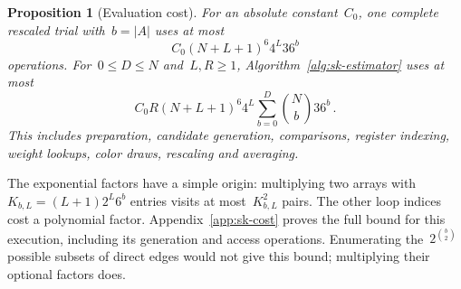 \documentclass[10pt]{article}
\theoremstyle{plain}
\newtheorem{proposition}[theorem]{Proposition}
\theoremstyle{definition}
\theoremstyle{remark}
\begin{document}
\begin{proposition}[Evaluation cost]\label{prop:sk-cost}
For an absolute constant~$C_0$, one complete rescaled trial with~$b=|A|$ uses at most
\begin{equation}\label{eq:sk-one-cost}
 C_0(N+L+1)^6 4^L36^b
\end{equation}
operations. For~$0\le D\le N$ and~$L,R\ge1$, Algorithm~\ref{alg:sk-estimator} uses at most
\begin{equation}\label{eq:sk-total-cost}
 C_0R(N+L+1)^6 4^L\sum_{b=0}^{D}\binom Nb36^b\,.
\end{equation}
This includes preparation, candidate generation, comparisons, register indexing, weight lookups, color draws, rescaling and averaging.
\end{proposition}
The exponential factors have a simple origin: multiplying two arrays with~$K_{b,L}=(L+1)2^L6^b$ entries visits at most~$K_{b,L}^2$ pairs. The other loop indices cost a polynomial factor. Appendix~\ref{app:sk-cost} proves the full bound for this execution, including its generation and access operations. Enumerating the~$2^{\binom b2}$ possible subsets of direct edges would not give this bound; multiplying their optional factors does.
\end{document}
